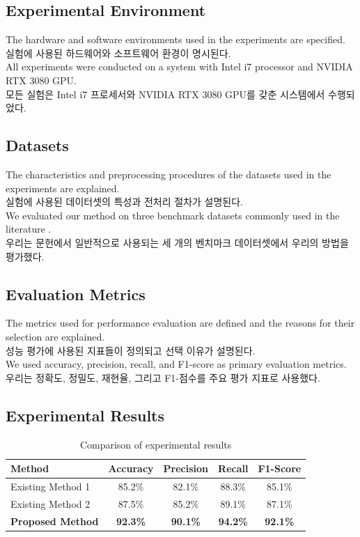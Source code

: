 \documentclass[preprint,12pt]{elsarticle}
\begin{document}
\subsection{Experimental Environment}
The hardware and software environments used in the experiments are specified. \\
실험에 사용된 하드웨어와 소프트웨어 환경이 명시된다. \\

All experiments were conducted on a system with Intel i7 processor and NVIDIA RTX 3080 GPU. \\
모든 실험은 Intel i7 프로세서와 NVIDIA RTX 3080 GPU를 갖춘 시스템에서 수행되었다. \\

\subsection{Datasets}
The characteristics and preprocessing procedures of the datasets used in the experiments are explained. \\
실험에 사용된 데이터셋의 특성과 전처리 절차가 설명된다. \\

We evaluated our method on three benchmark datasets commonly used in the literature \cite{deng2009imagenet}. \\
우리는 문헌에서 일반적으로 사용되는 세 개의 벤치마크 데이터셋에서 우리의 방법을 평가했다. \\

\subsection{Evaluation Metrics}
The metrics used for performance evaluation are defined and the reasons for their selection are explained. \\
성능 평가에 사용된 지표들이 정의되고 선택 이유가 설명된다. \\

We used accuracy, precision, recall, and F1-score as primary evaluation metrics. \\
우리는 정확도, 정밀도, 재현율, 그리고 F1-점수를 주요 평가 지표로 사용했다. \\

\subsection{Experimental Results}
\begin{table}[htbp]
\centering
\caption{Comparison of experimental results}
\label{tab:results}
\begin{tabular}{@{}lcccc@{}}
\toprule
Method & Accuracy & Precision & Recall & F1-Score \\
\midrule
Existing Method 1 & 85.2\% & 82.1\% & 88.3\% & 85.1\% \\
Existing Method 2 & 87.5\% & 85.2\% & 89.1\% & 87.1\% \\
\textbf{Proposed Method} & \textbf{92.3\%} & \textbf{90.1\%} & \textbf{94.2\%} & \textbf{92.1\%} \\
\bottomrule
\end{tabular}
\end{table}
\end{document}
